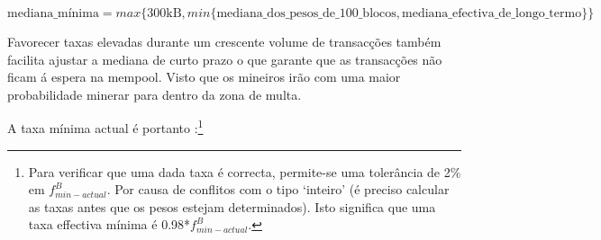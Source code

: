 
\[\textrm{mediana\_mínima} = max\{\textrm{300kB}, min\{\textrm{mediana\_dos\_pesos\_de\_100\_blocos}, \textrm{mediana\_efectiva\_de\_longo\_termo}\}\}\]


Favorecer taxas elevadas durante um crescente volume de transacções também facilita ajustar a mediana de curto prazo o que garante que as transacções não ficam á espera na mempool. Visto que os mineiros irão com uma maior probabilidade minerar para dentro da zona de multa. 

A taxa mínima actual é portanto :\footnote{Para verificar que uma dada taxa é correcta, permite-se uma tolerância de 2\% em $f^{B}_{min-actual}$. Por causa de conflitos com o tipo `inteiro' (é preciso calcular as taxas antes que os pesos estejam determinados). Isto significa que uma taxa effectiva mínima é 0.98*$f^{B}_{min-actual}$.}

